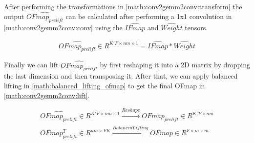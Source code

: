 After performing the transformations in \autoref{math:conv2gemm2conv:transform}
the output $\hat{OFmap_{prelift}}$ can be calculated after performing a 1x1
convolution in \autoref{math:conv2gemm2conv:conv} using the $\hat{IFmap}$ and
$\hat{Weight}$ tensors. 

\begin{equation}
    \begin{aligned}
        \hat{OFmap_{prelift}} \in R^{K'F\times nm \times 1} = \hat{IFmap}*\hat{Weight}
        \end{aligned}
    \label{math:conv2gemm2conv:conv}
\end{equation}

Finally we can lift $\hat{OFmap_{prelift}}$ by first reshaping it into a 2D
matrix by dropping the last dimension and then transposing it. After that, we
can apply balanced lifting in \autoref{math:balanced_lifting_ofmap} to get the
final OFmap in \autoref{math:conv2gemm2conv:lift}.

\begin{equation}
    \begin{aligned}
        \hat{OFmap_{prelift}} \in R^{K'F \times nm \times 1} \xrightarrow[]{Reshape} OFmap_{prelift} \in R^{K'F\times nm} \\
        OFmap_{prelift}^T \in R^{nm\times FK} \xrightarrow[]{Balanced Lifting} OFmap \in R^{F \times m \times m} \\
            \end{aligned}
    \label{math:conv2gemm2conv:lift}
\end{equation}

